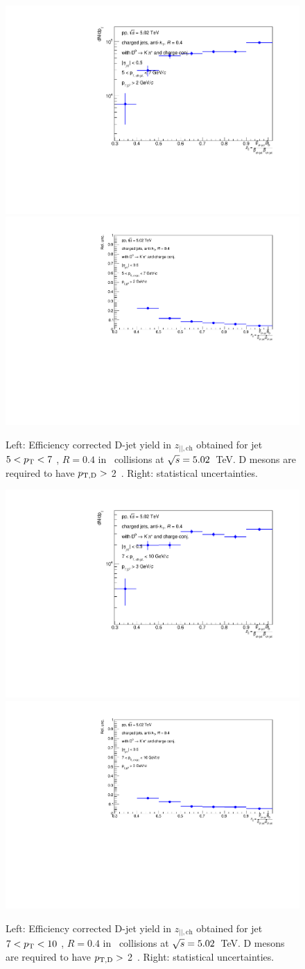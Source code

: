 \begin{figure}[bth]
\centering
\includegraphics[width=0.45\linewidth]{pp_2sig/R4_jetbin_5_7/jetPtSpectrum_SB_RebinProb_pTD2}
\includegraphics[width=0.45\linewidth]{pp_2sig/R4_jetbin_5_7/jetPtSpectrumUnc_SB_Rebin_pTD2}
\caption{Left: Efficiency corrected D-jet yield in $z_{||,\text{ch}}$ obtained for jet $5<p_{\text T}<7$ \GeVc, $R=0.4$ in \pp\ collisions at $\sqrt{s}=5.02$~TeV. D mesons are required to have $p_{\mathrm{T,D}}>$ 2~\GeVc. Right: statistical uncertainties.}
\label{fig:eq_pp_effCorr5_7_R4}
\end{figure}

\begin{figure}[bth]
\centering
\includegraphics[width=0.45\linewidth]{pp_2sig/R4_jetbin_7_10/jetPtSpectrum_SB_RebinProb_pTD3}
\includegraphics[width=0.45\linewidth]{pp_2sig/R4_jetbin_7_10/jetPtSpectrumUnc_SB_Rebin_pTD3}
\caption{Left: Efficiency corrected D-jet yield in $z_{||,\text{ch}}$ obtained for jet $7<p_{\text T}<10$ \GeVc, $R=0.4$ in \pp\ collisions at $\sqrt{s}=5.02$~TeV. D mesons are required to have $p_{\mathrm{T,D}}>$ 2~\GeVc. Right: statistical uncertainties.}
\label{fig:eq_pp_effCorr7_10_R4}
\end{figure}


